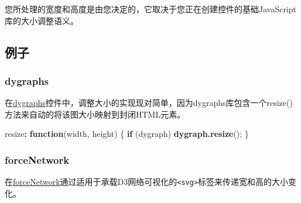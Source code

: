 \documentclass[]{book}
\newenvironment{Shaded}{\begin{snugshade}}{\end{snugshade}}
\newcommand{\KeywordTok}[1]{\textcolor[rgb]{0.13,0.29,0.53}{\textbf{#1}}}
\newcommand{\StringTok}[1]{\textcolor[rgb]{0.31,0.60,0.02}{#1}}
\newcommand{\ControlFlowTok}[1]{\textcolor[rgb]{0.13,0.29,0.53}{\textbf{#1}}}
\newcommand{\OperatorTok}[1]{\textcolor[rgb]{0.81,0.36,0.00}{\textbf{#1}}}
\newcommand{\NormalTok}[1]{#1}
\theoremstyle{definition}
\theoremstyle{definition}
\theoremstyle{definition}
\theoremstyle{remark}
\begin{document}
您所处理的宽度和高度是由您决定的，它取决于您正在创建控件的基础JavaScript库的大小调整语义。

\subsection{例子}\label{-2}

\subsubsection{dygraphs}\label{dygraphs}

在\href{http://rstudio.github.io/dygraphs/}{dygraphs}控件中，调整大小的实现现对简单，因为dygraphs库包含一个resize()方法来自动的将该图大小映射到封闭HTML元素。

\begin{Shaded}
\begin{Highlighting}[]
\NormalTok{resize}\OperatorTok{:}\StringTok{ }\ControlFlowTok{function}\NormalTok{(width, height) \{}
  \ControlFlowTok{if}\NormalTok{ (dygraph)}
    \KeywordTok{dygraph.resize}\NormalTok{();}
\NormalTok{\}}
\end{Highlighting}
\end{Shaded}

\subsubsection{forceNetwork}\label{forcenetwork}

在\href{https://github.com/d3VA/forceNetwork}{forceNetwork}通过适用于承载D3网络可视化的\texttt{\textless{}svg\textgreater{}}标签来传递宽和高的大小变化。
\end{document}
